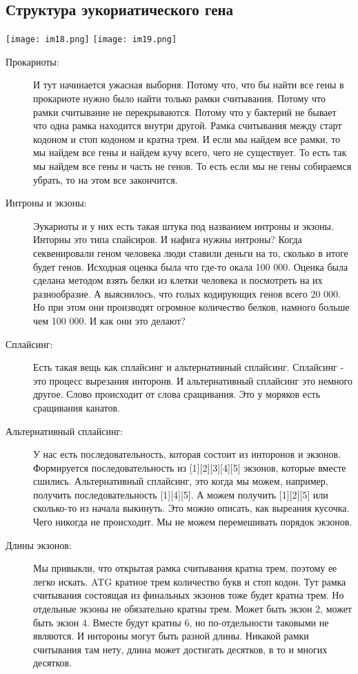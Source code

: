 \subsection{Структура эукориатического гена}
\texttt{[image: im18.png]}
\texttt{[image: im19.png]}
\begin{description}
\item[Прокариоты:]
И тут начинается ужасная выборня. Потому что, 
что бы найти все гены в прокариоте нужно было 
найти только рамки считывания. Потому что 
рамки считывание не перекрываются. Потому что 
у бактерий не бывает что одна рамка находится внутри другой. 
Рамка считывания между старт кодоном и стоп кодоном и кратна трем. 
И если мы найдем все рамки, то мы  найдем все гены и найдем кучу всего, 
чего не существует. То есть так мы найдем все гены и 
часть не генов. То есть если мы не гены собираемся убрать, то 
на этом все закончится. 

\item[Интроны и экзоны:]
Эукариоты и у них есть такая штука под названием интроны и экзоны. 
Инторны это типа спайсиров. И нафига нужны интроны? Когда 
секвенировали геном человека люди ставили деньги на то, 
сколько в итоге будет генов. Исходная оценка была что 
где-то окала 100 000. Оценка была сделана методом 
взять белки из клетки человека и посмотреть на их 
разнообразие. А выяснилось, что 
голых кодирующих генов всего 
20 000. Но при этом они производят 
огромное количество белков, намного больше чем 100 000. 
И как они это делают?  

\item[Сплайсинг:]
Есть такая вещь как сплайсинг и альтернативный сплайсинг. 
Сплайсинг - это процесс вырезания инторонв. И альтернативный 
сплайсинг это немного другое. Слово происходит от слова сращивания. 
Это у моряков есть сращивания канатов.


\item[Альтернативный сплайсинг:] 
У нас есть последовательность, которая состоит из инторонов и экзонов. Формируется последовательность из [1][2][3][4][5] экзонов, которые вместе сшились. 
Альтернативный сплайсинг, это когда мы можем, например, получить 
последовательность [1][4][5]. А можем 
получить [1][2][5] или сколько-то из начала выкинуть. Это 
можно описать, как выреания кусочка. Чего никогда не происходит. 
Мы не можем перемешивать порядок экзонов. 

\item[Длины экзонов:]
Мы привыкли, что открытая рамка считывания кратна трем, поэтому ее легко искать. 
ATG кратное трем количество букв и стоп кодон. 
Тут рамка считывания состоящая из финальных экзонов тоже будет 
кратна трем. Но отдельные экзоны не обязательно кратны трем. 
Может быть экзон 2, может быть экзон 4. Вместе будут 
кратны 6, но по-отдельности таковыми не являются. И 
интороны могут быть разной длины. Никакой рамки считывания 
там нету, длина может достигать десятков, в то и многих десятков. 


\end{description}
